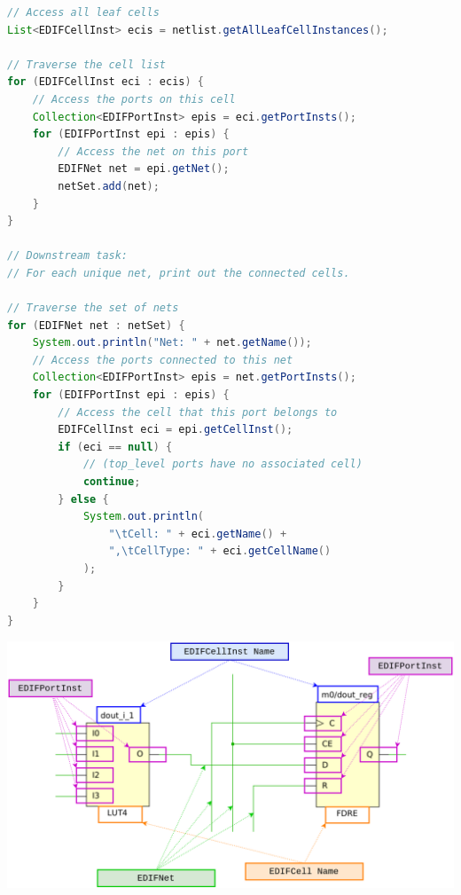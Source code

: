 \begin{multicols}{2}
\begin{lstlisting}[language=java, caption={Netlist extraction and traversal}, label={lst:netlist_extract}]
// Access all leaf cells
List<EDIFCellInst> ecis = netlist.getAllLeafCellInstances();

// Traverse the cell list
for (EDIFCellInst eci : ecis) {
    // Access the ports on this cell
    Collection<EDIFPortInst> epis = eci.getPortInsts();
    for (EDIFPortInst epi : epis) {
        // Access the net on this port
        EDIFNet net = epi.getNet();
        netSet.add(net);
    }
}

// Downstream task:
// For each unique net, print out the connected cells.

// Traverse the set of nets
for (EDIFNet net : netSet) {
    System.out.println("Net: " + net.getName());
    // Access the ports connected to this net
    Collection<EDIFPortInst> epis = net.getPortInsts();
    for (EDIFPortInst epi : epis) {
        // Access the cell that this port belongs to
        EDIFCellInst eci = epi.getCellInst();
        if (eci == null) {
            // (top_level ports have no associated cell)
            continue;
        } else {
            System.out.println(
                "\tCell: " + eci.getName() + 
                ",\tCellType: " + eci.getCellName()
            );
        }
    }
}
\end{lstlisting}

{
    \centering
    \includegraphics[valign=c, width=\columnwidth]{figures/traversal.png}
    \label{fig:traversal}
}
\vspace{0.5cm}


\end{multicols}
